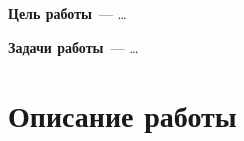 \documentclass[../lab.tex]{subfiles}
\begin{document}
\textbf{Цель работы}~--- \dots

\textbf{Задачи работы}~--- \dots

\section{Описание работы}
\end{document}

